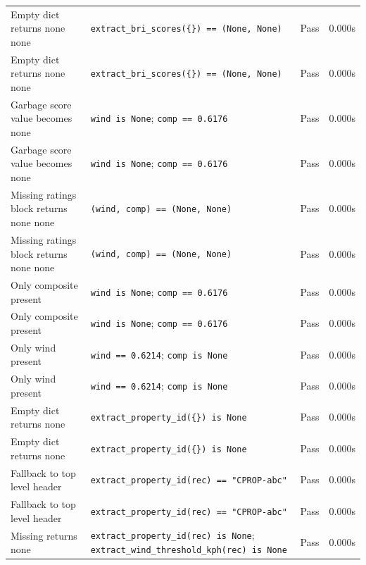 \documentclass[11pt,a4paper]{article}
\begin{document}
\begin{longtable}{p{6cm}p{5.5cm}cc}
    Empty dict returns none none & {\scriptsize \texttt{extract\_bri\_scores(\{\}) == (None, None)}} & \textcolor{green!60!black}{Pass} & 0.000s \\
    Empty dict returns none none & {\scriptsize \texttt{extract\_bri\_scores(\{\}) == (None, None)}} & \textcolor{green!60!black}{Pass} & 0.000s \\
    Garbage score value becomes none & {\scriptsize \texttt{wind is None}; \texttt{comp == 0.6176}} & \textcolor{green!60!black}{Pass} & 0.000s \\
    Garbage score value becomes none & {\scriptsize \texttt{wind is None}; \texttt{comp == 0.6176}} & \textcolor{green!60!black}{Pass} & 0.000s \\
    Missing ratings block returns none none & {\scriptsize \texttt{(wind, comp) == (None, None)}} & \textcolor{green!60!black}{Pass} & 0.000s \\
    Missing ratings block returns none none & {\scriptsize \texttt{(wind, comp) == (None, None)}} & \textcolor{green!60!black}{Pass} & 0.000s \\
    Only composite present & {\scriptsize \texttt{wind is None}; \texttt{comp == 0.6176}} & \textcolor{green!60!black}{Pass} & 0.000s \\
    Only composite present & {\scriptsize \texttt{wind is None}; \texttt{comp == 0.6176}} & \textcolor{green!60!black}{Pass} & 0.000s \\
    Only wind present & {\scriptsize \texttt{wind == 0.6214}; \texttt{comp is None}} & \textcolor{green!60!black}{Pass} & 0.000s \\
    Only wind present & {\scriptsize \texttt{wind == 0.6214}; \texttt{comp is None}} & \textcolor{green!60!black}{Pass} & 0.000s \\
    Empty dict returns none & {\scriptsize \texttt{extract\_property\_id(\{\}) is None}} & \textcolor{green!60!black}{Pass} & 0.000s \\
    Empty dict returns none & {\scriptsize \texttt{extract\_property\_id(\{\}) is None}} & \textcolor{green!60!black}{Pass} & 0.000s \\
    Fallback to top level header & {\scriptsize \texttt{extract\_property\_id(rec) == "CPROP-abc"}} & \textcolor{green!60!black}{Pass} & 0.000s \\
    Fallback to top level header & {\scriptsize \texttt{extract\_property\_id(rec) == "CPROP-abc"}} & \textcolor{green!60!black}{Pass} & 0.000s \\
    Missing returns none & {\scriptsize \texttt{extract\_property\_id(rec) is None}; \texttt{extract\_wind\_threshold\_kph(rec) is None}} & \textcolor{green!60!black}{Pass} & 0.000s \\

\end{longtable}
\end{document}
